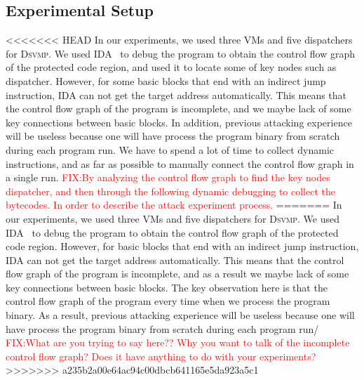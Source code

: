\documentclass[conference]{IEEEtran}
\newcommand{\DSVMP}{\textsc{Dsvmp}\xspace}
\newcommand\FIXME[1]{\textcolor{red}{FIX:}\textcolor{red}{#1}}
\begin{document}
\subsection{Experimental Setup}
<<<<<<< HEAD
In our experiments, we used three VMs and five dispatchers for \DSVMP. We used IDA~\cite{14Idapro} to debug the program to obtain the control flow graph of the protected code region, and used it to locate some of key nodes such as dispatcher. 
However, for some basic blocks that end with an indirect jump instruction, IDA can not get the target address automatically. This means that the control flow graph of the program is incomplete, and we maybe lack of some key connections between basic blocks. In addition, previous attacking experience will be useless because one will have process the program binary from scratch during each program run. 
We have to spend a lot of time to collect dynamic instructions, and as far as possible to manually connect the control flow graph in a single run.
\FIXME{By analyzing the control flow graph to find the key nodes dispatcher, and then through the following dynamic debugging to collect the bytecodes. In order to describe the attack experiment process.}
=======
In our experiments, we used three VMs and five dispatchers for \DSVMP. We used IDA~\cite{14Idapro} to debug the program to obtain the control flow graph of the protected code region. 
However, for basic blocks that end with an indirect jump instruction, IDA can not get the target address automatically. This means that the control flow graph of the program is incomplete, 
and as a result we maybe lack of some key connections between basic blocks. The key observation here is that the control flow graph of the program every time when we process the program binary. 
As a result, previous attacking experience will be useless because one will have process the program binary from scratch during each program run/ 
\FIXME{What are you trying to say here?? Why you want to talk of the incomplete control flow graph? Does it have anything to do with your experiments?}
>>>>>>> a235b2a00e64ac94c00dbcb641165e5da923a5c1
\end{document}
